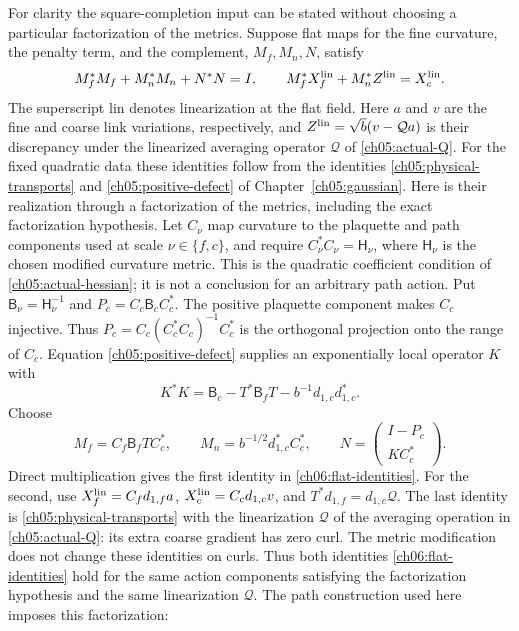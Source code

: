 For clarity the square-completion input can be stated without choosing a
particular factorization of the metrics. Suppose flat maps for the fine curvature, the penalty term, and the
complement, $M_f,M_n,N$, satisfy
\begin{equation}
 M_f^*M_f+M_n^*M_n+N^*N=I,
 \qquad M_f^*X_f^{\rm lin}+M_n^*Z^{\rm lin}=X_c^{\rm lin}.
 \label{ch06:flat-identities}
\end{equation}
The superscript $\mathrm{lin}$ denotes linearization at the flat field.
Here $a$ and $v$ are the fine and coarse link variations, respectively,
and $Z^{\rm lin}=\sqrt b(v-\mathcal Q a)$ is their discrepancy under the
linearized averaging operator $\mathcal Q$ of \eqref{ch05:actual-Q}. For the fixed quadratic data these identities follow from the
identities \eqref{ch05:physical-transports} and \eqref{ch05:positive-defect} of Chapter~\ref{ch05:gaussian}.
Here is their realization through a factorization of the metrics, including the exact factorization hypothesis.
Let $C_\nu$ map curvature to the plaquette and path components used at
scale $\nu\in\{f,c\}$, and require
$C_\nu^*C_\nu=\mathsf H_\nu$, where $\mathsf H_\nu$ is the chosen
modified curvature metric. This is the quadratic coefficient condition
of \eqref{ch05:actual-hessian}; it is not a conclusion for an arbitrary
path action. Put $\mathsf B_\nu=\mathsf H_\nu^{-1}$ and
$P_c=C_c\mathsf B_cC_c^*$. The positive plaquette component makes $C_c$
injective. Thus $P_c=C_c(C_c^*C_c)^{-1}C_c^*$ is the orthogonal
projection onto the range of $C_c$. Equation
\eqref{ch05:positive-defect} supplies an exponentially local operator $K$
with
\[
 K^*K=\mathsf B_c-T^*\mathsf B_fT-b^{-1}d_{1,c}d_{1,c}^*.
\]
Choose
\[
 M_f=C_f\mathsf B_fTC_c^*,\qquad
 M_n=b^{-1/2}d_{1,c}^*C_c^*,\qquad
 N=\begin{pmatrix}I-P_c\\KC_c^*\end{pmatrix}.
\]
Direct multiplication gives the first identity in
\eqref{ch06:flat-identities}. For the second, use
$X_f^{\rm lin}=C_fd_{1,f}a$,
$X_c^{\rm lin}=C_cd_{1,c}v$, and
$T^*d_{1,f}=d_{1,c}\mathcal Q$. The last identity is
\eqref{ch05:physical-transports} with the linearization $\mathcal Q$ of the averaging operation in
\eqref{ch05:actual-Q}: its extra coarse gradient has zero curl.
The metric modification does not change these identities on curls.
Thus both identities \eqref{ch06:flat-identities} hold for the same action components satisfying the factorization hypothesis and
the same linearization $\mathcal Q$. The path construction used here imposes this factorization:
